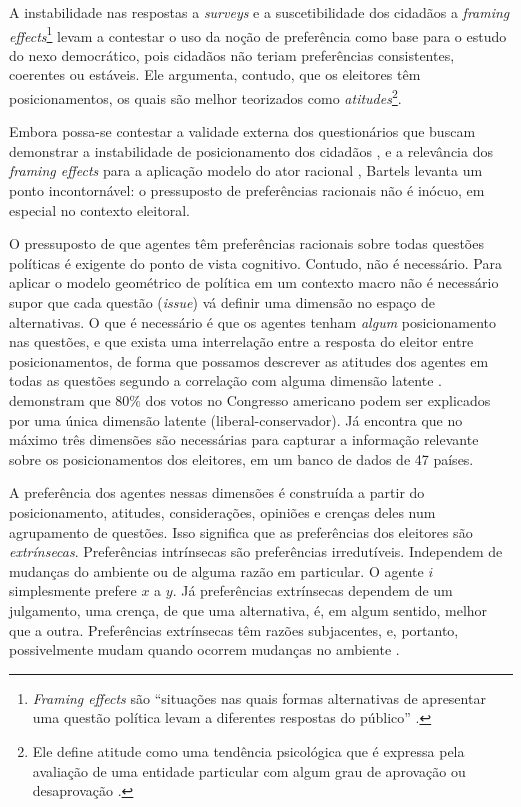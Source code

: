 A instabilidade nas respostas a \textit{surveys} e a suscetibilidade dos
cidadãos a \textit{framing effects}\footnote{\textit{Framing effects} são
  ``situações nas quais formas alternativas de apresentar uma questão política
  levam a diferentes respostas do público'' \cite[p.56]{bartels2003democracy}.}
levam  a contestar o uso da noção de
preferência como base para o estudo do nexo democrático, pois cidadãos não
teriam preferências consistentes, coerentes ou estáveis. Ele argumenta, contudo,
que os eleitores têm posicionamentos, os quais são melhor teorizados como
\textit{atitudes}\footnote{ Ele define atitude como uma tendência psicológica
  que é expressa pela avaliação de uma entidade particular com algum grau de
  aprovação ou desaprovação \cite[p.52]{bartels2003democracy}.}.

Embora possa-se contestar a validade externa dos questionários que buscam
demonstrar a instabilidade de posicionamento dos cidadãos
\cite{druckman2012public}, e a relevância dos \textit{framing effects} para a
aplicação modelo do ator racional \cite[p. 107]{gintis2016individuality},
Bartels levanta um ponto incontornável: o pressuposto de preferências racionais
não é inócuo, em especial no contexto eleitoral.

O pressuposto de que agentes têm preferências racionais sobre todas questões
políticas é exigente do ponto de vista cognitivo. Contudo, não é necessário.
Para aplicar o modelo geométrico de política em um contexto macro não é
necessário supor que cada questão (\textit{issue}) vá definir uma dimensão no
espaço de alternativas. O que é necessário é que os agentes tenham
\textit{algum} posicionamento nas questões, e que exista uma interrelação entre
a resposta do eleitor entre posicionamentos, de forma que possamos descrever as
atitudes dos agentes em todas as questões segundo a correlação com alguma
dimensão latente \cite{poole2005spatial,laver2014measuring}.
 demonstram que $80\%$ dos votos no Congresso
americano podem ser explicados por uma única dimensão latente
(liberal-conservador). Já  encontra que no máximo
três dimensões são necessárias para capturar a informação relevante sobre os
posicionamentos dos eleitores, em um banco de dados de 47 países.

A preferência dos agentes nessas dimensões é  construída a partir do
posicionamento, atitudes, considerações, opiniões e crenças deles num
agrupamento de questões. Isso significa que as preferências dos eleitores são
\textit{extrínsecas}. Preferências intrínsecas são preferências irredutíveis.
Independem de mudanças do ambiente ou de alguma razão em particular. O agente
\(i\) simplesmente prefere \(x\) a \(y\). Já preferências extrínsecas dependem
de um julgamento, uma crença, de que uma alternativa, é, em algum sentido, melhor
que a outra. Preferências extrínsecas têm razões subjacentes, e, portanto,
possivelmente mudam quando ocorrem mudanças no ambiente \cite{liu2010wright,
  binmore2008rational}.

